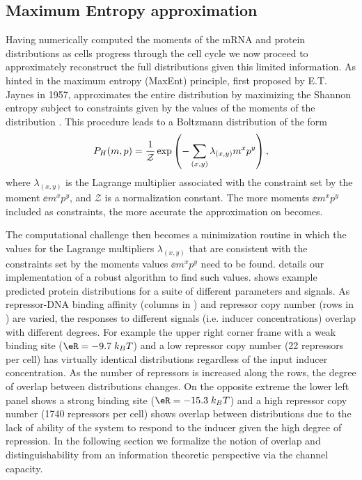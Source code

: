 \subsection*{Maximum Entropy approximation}

Having numerically computed the moments of the mRNA and protein distributions as
cells progress through the cell cycle we now proceed to approximately
reconstruct the full distributions given this limited information. As hinted in
 the maximum entropy (MaxEnt) principle, first proposed by
E.T. Jaynes in 1957, approximates the entire distribution by maximizing the
Shannon entropy subject to constraints given by the values of the moments of the
distribution \cite{Jaynes1957}. This procedure leads to a Boltzmann distribution
of the form 
\begin{equation}
  P_H(m, p) = {1 \over \mathcal{Z}}
              \exp \left( - \sum_{(x,y)} \lambda_{(x,y)} m^x p^y \right),
  \label{eq_maxEnt_joint}
\end{equation}
where $\lambda_{(x,y)}$ is the Lagrange multiplier associated with the
constraint set by the moment $\ee{m^x p^y}$, and $\mathcal{Z}$ is a
normalization constant. The more moments $\ee{m^x p^y}$ included as constraints,
the more accurate the approximation on  becomes.

The computational challenge then becomes a minimization routine in which the
values for the Lagrange multipliers $\lambda_{(x,y)}$ that are consistent with
the constraints set by the moments values $\ee{m^x p^y}$ need to be found.
 details our implementation of a robust algorithm to find such
values.  shows example predicted protein distributions for a
suite of different parameters and signals. As repressor-DNA binding affinity
(columns in ) and repressor copy number (rows in
) are varied, the responses to different signals (i.e. inducer
concentrations) overlap with different degrees. For example the upper right
corner frame with a weak binding site ($\eR = -9.7 \; k_BT$) and a low repressor
copy number (22 repressors per cell) has virtually identical distributions
regardless of the input inducer concentration. As the number of repressors is
increased along the rows, the degree of overlap between distributions changes.
On the opposite extreme the lower left panel shows a strong binding site ($\eR =
-15.3 \; k_BT$) and a high repressor copy number (1740 repressors per cell)
shows overlap between distributions due to the lack of ability of the system to
respond to the inducer given the high degree of repression. In the following
section we formalize the notion of overlap and distinguishability from an
information theoretic perspective via the channel capacity.

